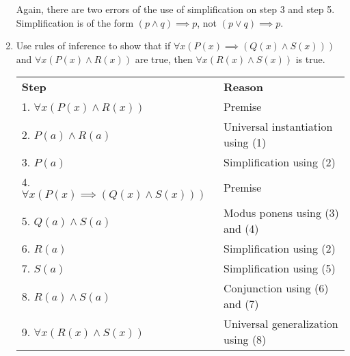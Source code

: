 \documentclass[11pt]{article}
\begin{document}
\begin{enumerate}[label=\textbf{\arabic*.}]
	Again, there are two errors of the use of simplification on step 3 and step 5. Simplification is of the form $(p \land q) \implies p$, not $(p \lor q) \implies p$. 

	\item Use rules of inference to show that if $\forall x(P(x) \implies (Q(x) \land S(x)))$ and $\forall x(P(x) \land R(x))$ are true, then $\forall x(R(x) \land S(x))$ is true.
	
	\begin{center}
	\begin{tabular}{ll}
		\textbf{Step} & \textbf{Reason} \\
		1. $\forall x(P(x) \land R(x))$ & Premise \\
		2. $P(a) \land R(a)$ & Universal instantiation using (1) \\
		3. $P(a)$ & Simplification using (2) \\
		4. $\forall x(P(x) \implies (Q(x) \land S(x)))$ & Premise \\
		5. $Q(a) \land S(a)$ & Modus ponens using (3) and (4) \\
		6. $R(a)$ & Simplification using (2) \\
		7. $S(a)$ & Simplification using (5) \\
		8. $R(a) \land S(a)$ & Conjunction using (6) and (7) \\
		9. $\forall x(R(x) \land S(x))$ & Universal generalization using (8)
	\end{tabular}
	\end{center}
\end{enumerate}
\end{document}

